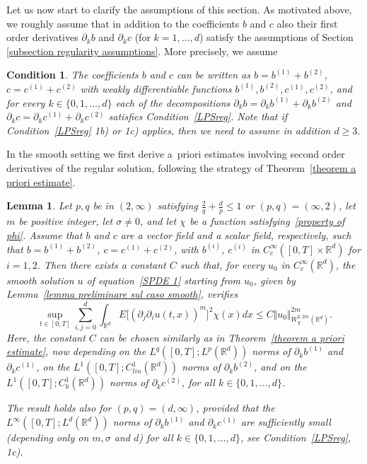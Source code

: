\documentclass[a4paper,10pt]{article}
\newtheorem{condition}[theorem]{Condition}
\newtheorem{lemma}[theorem]{Lemma}
\begin{document}
Let us now start to clarify the assumptions of this section. As motivated above, we roughly assume that in addition to the coefficients $b$ and $c$ also their first order derivatives $\partial_{k}b$ and $\partial_{k}c$ (for $k=1,\ldots,d$) satisfy the assumptions of Section
\ref{subsection regularity assumptions}. More precisely, we assume

\begin{condition}
\label{LPSreg second order}
The coefficients $b$ and $c$ can be written as $b = b^{(1)} + b^{(2)}$, $c = c^{(1)} + c^{(2)}$ with weakly differentiable functions $b^{(1)}, b^{(2)}, c^{(1)}, c^{(2)}$, and  
for every $k \in \{0,1,\ldots,d\}$ each of the decompositions $\partial_k b = \partial_k b^{(1)} + \partial_k b^{(2)}$ and $\partial_k c = \partial_k c^{(1)} + \partial_k c^{(2)}$ satisfies Condition~\ref{LPSreg}. Note that if Condition~\ref{LPSreg} 1b) or 1c) applies, then we need to assume in addition $d \geq 3$.
\end{condition}

In the smooth setting we first derive a~priori estimates involving second order derivatives of the regular solution, following the strategy of Theorem~\ref{theorem a priori estimate}.

\begin{lemma}
Let $p,q$ be in $(2,\infty)$ satisfying $\frac{2}{q}+\frac{d}{p}\leq1$ or $(p,q)=(\infty,2)$,
let $m$ be positive integer, let $\sigma \neq 0$, and let $\chi$ be a function 
satisfying~\eqref{property of phi}. Assume that $b$ and $c$ are a vector field and a scalar field, respectively, such that $b=b^{(1)}+b^{(2)}$, $c=c^{(1)}+c^{(2)}$, with $b^{(i)}$, $c^{(i)}$ in $C_{c}^{\infty}([0,T]\times \mathbb{R}^{d})$ for $i=1,2$. Then there exists a constant $C$ such that, for every $u_{0}$ in $C_{c}^{\infty}(\mathbb{R}^{d})$, the smooth solution $u$ of equation~\eqref{SPDE 1} starting from $u_{0}$, given by Lemma~\ref{lemma preliminare sul caso smooth}, verifies
\[
\sup_{t\in [0,T]}\sum_{i,j=0}^{d} \int_{\mathbb{R}^{d}} E\big[ (\partial_j \partial_{i}u(t,x))^{m} \big]^{2} \chi(x) dx\leq C \Vert u_{0} \Vert_{W_{\chi}^{2,2m}(\mathbb{R}^{d}) }^{2m}.
\]
Here, the constant $C$ can be chosen similarly as in Theorem~\ref{theorem a priori estimate}, now depending on the $L^{q}([0,T];L^{p}(\mathbb{R}^{d}))$ norms of $\partial_k b^{(1)}$ and $\partial_k c^{(1)}$, on the $L^{1}([0,T];C_{lin}^{1}(\mathbb{R}^{d}))$ norms of
$\partial_k b^{(2)}$, and on the $L^{1}([0,T];C_{b}^{1}(\mathbb{R}^{d}))$ norms of $\partial_k c^{(2)}$, for all $k \in \{0,1,\ldots,d\}$.

The result holds also for $(p,q)=(d,\infty)$, provided that the $L^{\infty}([0,T];L^{d}(\mathbb{R}^{d}))$ norms of $\partial_k b^{(1)}$ and $\partial_k c^{(1)}$ are sufficiently small (depending only on $m,\sigma$ and $d$) for all $k \in \{0,1,\ldots,d\}$, see Condition~\ref{LPSreg}, 1c).
\end{lemma}
\end{document}
